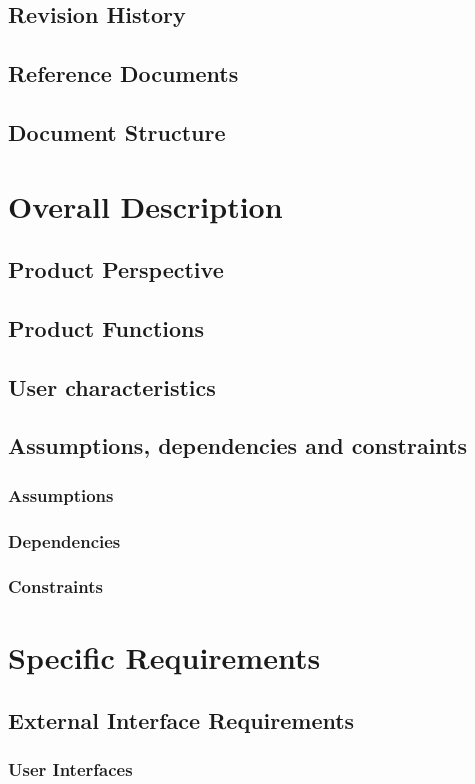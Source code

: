 \documentclass{article}
\begin{document}
\subsection{Revision History}
\subsection{Reference Documents}
\subsection{Document Structure}
\section{Overall Description}
\subsection{Product Perspective}
\subsection{Product Functions}
\subsection{User characteristics}
\subsection{Assumptions, dependencies and constraints}
\subsubsection{Assumptions}
\subsubsection{Dependencies}
\subsubsection{Constraints}
\section{Specific Requirements}
\subsection{External Interface Requirements}
\subsubsection{User Interfaces}
\end{document}
